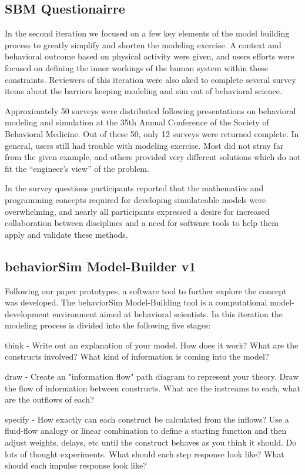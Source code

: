 \documentclass[conference]{IEEEtran}
\begin{document}
   
\subsection{SBM Questionairre}
In the second iteration we focused on a few key elements of the model building process to greatly simplify and shorten the modeling exercise.
A context and behavioral outcome based on physical activity were given, and users efforts were focused on defining the inner workings of the human system within these constraints.
Reviewers of this iteration were also aked to complete several survey items about the barriers keeping modeling and sim out of behavioral science.

Approximately 50 surveys were distributed following presentations on behavioral modeling and simulation at the 35th Annual Conference of the Society of Behavioral Medicine. 
Out of these 50, only 12 surveys were returned complete.
In general, users still had trouble with modeling exercise.
Most did not stray far from the given example, and others provided very different solutions which do not fit the ``engineer's view'' of the problem.

In the survey questions participants reported that the mathematics and programming concepts required for developing simulateable models were overwhelming, and nearly all participants expressed a desire for increased collaboration between disciplines and a need for software tools to help them apply and validate these methods.
  
\subsection{behaviorSim Model-Builder v1}
Following our paper prototypes, a software tool to further explore the concept was developed.
The behaviorSim Model-Building tool is a computational model-development environment aimed at behavioral scientists.
In this iteration the modeling process is divided into the following five stages:

think - 
Write out an explanation of your model. 
How does it work? 
What are the constructs involved? 
What kind of information is coming into the model?

draw - 
Create an "information flow" path diagram to represent your theory. 
Draw the flow of information between constructs. 
What are the instreams to each, what are the outflows of each?

specify - 
How exactly can each construct be calculated from the inflows? 
Use a fluid-flow analogy or linear combination to define a starting function and then adjust weights, delays, etc until the construct behaves as you think it should. 
Do lots of thought experiments. 
What should each step response look like? 
What should each impulse response look like?
\end{document}
